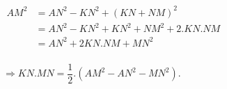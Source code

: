 \begin{ex}
{\begin{enumerate}
    		\begin{center}
    		$\begin{array}{ll}
    AM^2&=AN^2-KN^2+(KN+NM)^2\\
    	&=AN^2-KN^2+KN^2+NM^2+2.KN.NM\\
    	&=AN^2+2KN.NM+MN^2\\
 
    	\end{array}$\end{center}
    	 $  \Rightarrow KN.MN=\dfrac{1}{2}.(AM^2-AN^2-MN^2).$
    \end{enumerate}  }
\end{ex}


